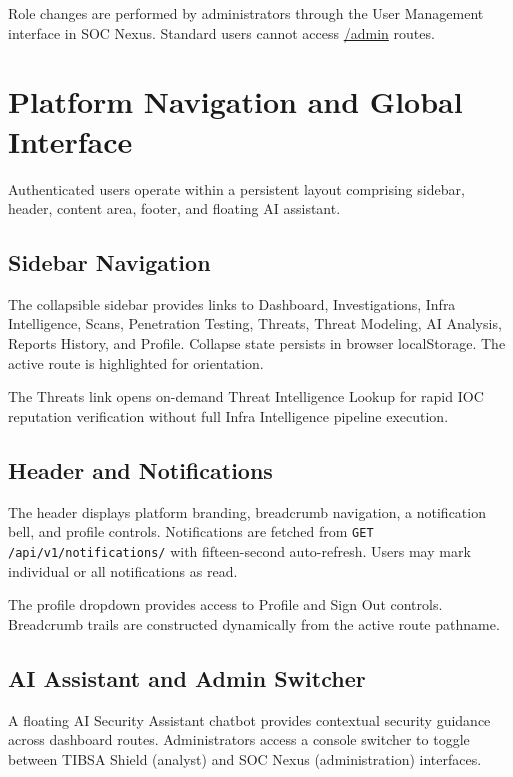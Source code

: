 Role changes are performed by administrators through the User Management interface in SOC Nexus. Standard users cannot access \url{/admin} routes.

\section{Platform Navigation and Global Interface}

Authenticated users operate within a persistent layout comprising sidebar, header, content area, footer, and floating AI assistant.

\subsection{Sidebar Navigation}

The collapsible sidebar provides links to Dashboard, Investigations, Infra Intelligence, Scans, Penetration Testing, Threats, Threat Modeling, AI Analysis, Reports History, and Profile. Collapse state persists in browser localStorage. The active route is highlighted for orientation.

The Threats link opens on-demand Threat Intelligence Lookup for rapid IOC reputation verification without full Infra Intelligence pipeline execution.

\subsection{Header and Notifications}

The header displays platform branding, breadcrumb navigation, a notification bell, and profile controls. Notifications are fetched from \texttt{GET /api/v1/notifications/} with fifteen-second auto-refresh. Users may mark individual or all notifications as read.

The profile dropdown provides access to Profile and Sign Out controls. Breadcrumb trails are constructed dynamically from the active route pathname.

\subsection{AI Assistant and Admin Switcher}

A floating AI Security Assistant chatbot provides contextual security guidance across dashboard routes. Administrators access a console switcher to toggle between TIBSA Shield (analyst) and SOC Nexus (administration) interfaces.

